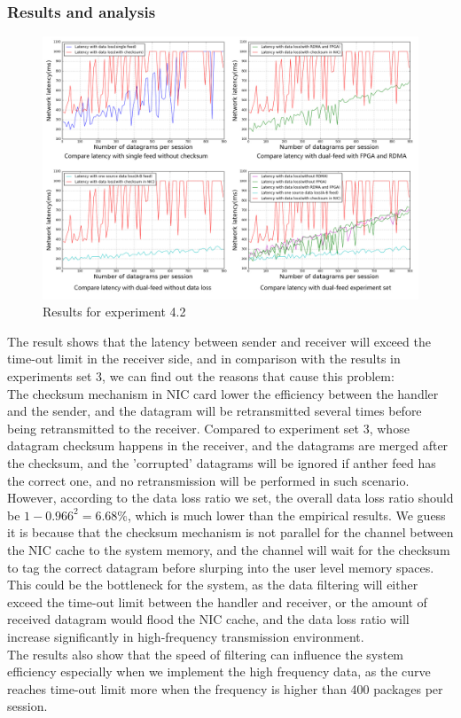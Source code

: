 \documentclass[11pt,openright,a4paper]{report}
\begin{document}
\subsubsection{Results and analysis}
\begin{figure}[H]
\centering
\includegraphics[width=1.0\linewidth]{./picture/experiments/exp4/dataLoss_compare.jpg}
\caption{Results for experiment 4.2}
\label{fig:dataLoss_compare}
\end{figure}
The result shows that the latency between sender and receiver will exceed the time-out limit in the receiver side, and in comparison with the results in experiments set 3, we can find out the reasons that cause this problem:\\
The checksum mechanism in NIC card lower the efficiency between the handler and the sender, and the datagram will be retransmitted several times before being retransmitted to the receiver. Compared to experiment set 3, whose datagram checksum happens in the receiver, and the datagrams are merged after the checksum, and the 'corrupted' datagrams will be ignored if anther feed has the correct one, and no retransmission will be performed in such scenario.\\
However, according to the data loss ratio we set, the overall data loss ratio should be $1-0.966^{2}=6.68\%$, which is much lower than the empirical results. We guess it is because that the checksum mechanism is not parallel for the channel between the NIC cache to the system memory, and the channel will wait for the checksum to tag the correct datagram before slurping into the user level memory spaces. This could be the bottleneck for the system, as the data filtering will either exceed the time-out limit between the handler and receiver, or the amount of received datagram would flood the NIC cache, and the data loss ratio will increase significantly in high-frequency transmission environment.\\
The results also show that the speed of filtering can influence the system efficiency especially when we implement the high frequency data, as the curve reaches time-out limit more when the frequency is higher than 400 packages per session.\\
\end{document}
